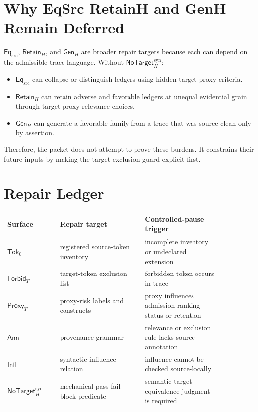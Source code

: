 \documentclass[11pt]{article}
\newcommand{\GenH}{\mathsf{Gen}_{H}}
\newcommand{\EqSrc}{\mathsf{Eq}_{\mathrm{src}}}
\newcommand{\RetainH}{\mathsf{Retain}_{H}}
\newcommand{\NoTargetSyn}{\mathsf{NoTarget}_{H}^{\mathrm{syn}}}
\newcommand{\SrcTok}{\mathsf{Tok}_{0}}
\newcommand{\ForbidT}{\mathsf{Forbid}_{T}}
\newcommand{\ProxyT}{\mathsf{Proxy}_{T}}
\newcommand{\Annot}{\mathsf{Ann}}
\newcommand{\Influence}{\mathsf{Infl}}
\begin{document}
\section{Why EqSrc RetainH and GenH Remain Deferred}

\(\EqSrc\), \(\RetainH\), and \(\GenH\) are broader repair targets because
each can depend on the admissible trace language. Without \(\NoTargetSyn\):

\begin{itemize}
    \item \(\EqSrc\) can collapse or distinguish ledgers using hidden
    target-proxy criteria.
    \item \(\RetainH\) can retain adverse and favorable ledgers at unequal
    evidential grain through target-proxy relevance choices.
    \item \(\GenH\) can generate a favorable family from a trace that was
    source-clean only by assertion.
\end{itemize}

Therefore, the packet does not attempt to prove these burdens. It constrains
their future inputs by making the target-exclusion guard explicit first.

\section{Repair Ledger}

\begin{center}
\begin{tabular}{p{0.21\linewidth}p{0.34\linewidth}p{0.31\linewidth}}
\textbf{Surface} & \textbf{Repair target} & \textbf{Controlled-pause trigger} \\
\hline
\(\SrcTok\) & registered source-token inventory & incomplete inventory or undeclared extension \\
\(\ForbidT\) & target-token exclusion list & forbidden token occurs in trace \\
\(\ProxyT\) & proxy-risk labels and constructs & proxy influences admission ranking status or retention \\
\(\Annot\) & provenance grammar & relevance or exclusion rule lacks source annotation \\
\(\Influence\) & syntactic influence relation & influence cannot be checked source-locally \\
\(\NoTargetSyn\) & mechanical pass fail block predicate & semantic target-equivalence judgment is required \\
\end{tabular}
\end{center}
\end{document}
